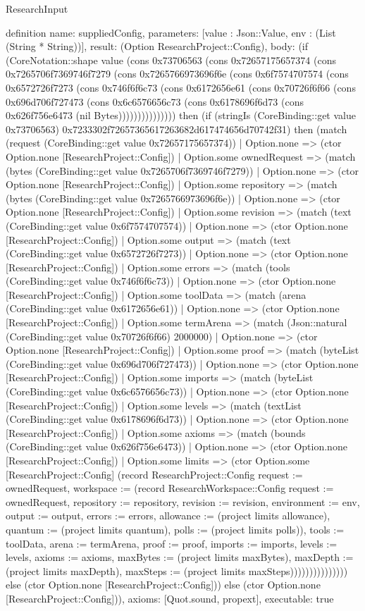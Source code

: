 \begin{lexlean}{ResearchInput}
\begin{semanticmodule}
definition{
 name: suppliedConfig,
 parameters: [value : Json::Value, env : (List (String * String))],
 result: (Option ResearchProject::Config),
 body: (if (CoreNotation::shape value (cons 0x73706563 (cons 0x72657175657374 (cons 0x7265706f7369746f7279 (cons 0x7265766973696f6e (cons 0x6f7574707574 (cons 0x6572726f7273 (cons 0x746f6f6c73 (cons 0x6172656e61 (cons 0x70726f6f66 (cons 0x696d706f727473 (cons 0x6c6576656c73 (cons 0x6178696f6d73 (cons 0x626f756e6473 (nil Bytes))))))))))))))) then (if (stringIs (CoreBinding::get value 0x73706563) 0x7233302f72657365617263682d617474656d70742f31) then (match (request (CoreBinding::get value 0x72657175657374)) | Option.none => (ctor Option.none [ResearchProject::Config]) | Option.some ownedRequest => (match (bytes (CoreBinding::get value 0x7265706f7369746f7279)) | Option.none => (ctor Option.none [ResearchProject::Config]) | Option.some repository => (match (bytes (CoreBinding::get value 0x7265766973696f6e)) | Option.none => (ctor Option.none [ResearchProject::Config]) | Option.some revision => (match (text (CoreBinding::get value 0x6f7574707574)) | Option.none => (ctor Option.none [ResearchProject::Config]) | Option.some output => (match (text (CoreBinding::get value 0x6572726f7273)) | Option.none => (ctor Option.none [ResearchProject::Config]) | Option.some errors => (match (tools (CoreBinding::get value 0x746f6f6c73)) | Option.none => (ctor Option.none [ResearchProject::Config]) | Option.some toolData => (match (arena (CoreBinding::get value 0x6172656e61)) | Option.none => (ctor Option.none [ResearchProject::Config]) | Option.some termArena => (match (Json::natural (CoreBinding::get value 0x70726f6f66) 2000000) | Option.none => (ctor Option.none [ResearchProject::Config]) | Option.some proof => (match (byteList (CoreBinding::get value 0x696d706f727473)) | Option.none => (ctor Option.none [ResearchProject::Config]) | Option.some imports => (match (byteList (CoreBinding::get value 0x6c6576656c73)) | Option.none => (ctor Option.none [ResearchProject::Config]) | Option.some levels => (match (textList (CoreBinding::get value 0x6178696f6d73)) | Option.none => (ctor Option.none [ResearchProject::Config]) | Option.some axioms => (match (bounds (CoreBinding::get value 0x626f756e6473)) | Option.none => (ctor Option.none [ResearchProject::Config]) | Option.some limits => (ctor Option.some [ResearchProject::Config] (record ResearchProject::Config {request := ownedRequest, workspace := (record ResearchWorkspace::Config {request := ownedRequest, repository := repository, revision := revision, environment := env, output := output, errors := errors, allowance := (project limits allowance), quantum := (project limits quantum), polls := (project limits polls)}), tools := toolData, arena := termArena, proof := proof, imports := imports, levels := levels, axioms := axioms, maxBytes := (project limits maxBytes), maxDepth := (project limits maxDepth), maxSteps := (project limits maxSteps)})))))))))))))) else (ctor Option.none [ResearchProject::Config])) else (ctor Option.none [ResearchProject::Config])),
 axioms: [Quot.sound, propext],
 executable: true
}


\end{semanticmodule}
\end{lexlean}
